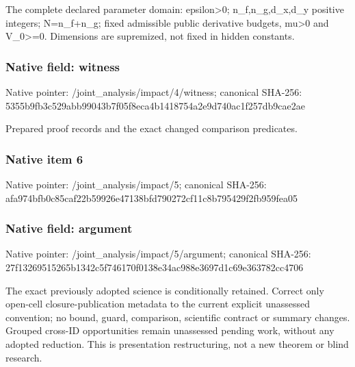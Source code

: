 \documentclass[10pt,a4paper]{article}
\begin{document}
\begingroup\raggedright\sloppy The complete declared parameter domain:\allowbreak{} epsilon>0;\allowbreak{} n\_\allowbreak{}f,\allowbreak{}n\_\allowbreak{}g,\allowbreak{}d\_\allowbreak{}x,\allowbreak{}d\_\allowbreak{}y positive integers;\allowbreak{} N=\allowbreak{}n\_\allowbreak{}f+n\_\allowbreak{}g;\allowbreak{} fixed admissible public derivative budgets,\allowbreak{} mu>0 and V\_\allowbreak{}0>=\allowbreak{}0. Dimensions are supremized,\allowbreak{} not fixed in hidden constants.\par\endgroup

\subsubsection{Native field: witness}
Native pointer: /joint\_\allowbreak{}analysis/impact/4/witness; canonical SHA-256: 5355b9fb3c529abb99043b7f05f8eca4b1418754a2e9d740ac1f257db9cae2ae

\begingroup\raggedright\sloppy Prepared proof records and the exact changed comparison predicates.\par\endgroup

\subsubsection{Native item 6}
Native pointer: /joint\_\allowbreak{}analysis/impact/5; canonical SHA-256: afa974bfb0c85caf22b59926e47138bfd790272cf11c8b795429f2fb959fea05

\subsubsection{Native field: argument}
Native pointer: /joint\_\allowbreak{}analysis/impact/5/argument; canonical SHA-256: 27f13269515265b1342c5f746170f0138e34ac988e3697d1c69e363782cc4706

\begingroup\raggedright\sloppy The exact previously adopted science is conditionally retained. Correct only open-cell closure-publication metadata to the current explicit unassessed convention;\allowbreak{} no bound,\allowbreak{} guard,\allowbreak{} comparison,\allowbreak{} scientific contract or summary changes. Grouped cross-ID opportunities remain unassessed pending work,\allowbreak{} without any adopted reduction. This is presentation restructuring,\allowbreak{} not a new theorem or blind research.\par\endgroup
\end{document}
